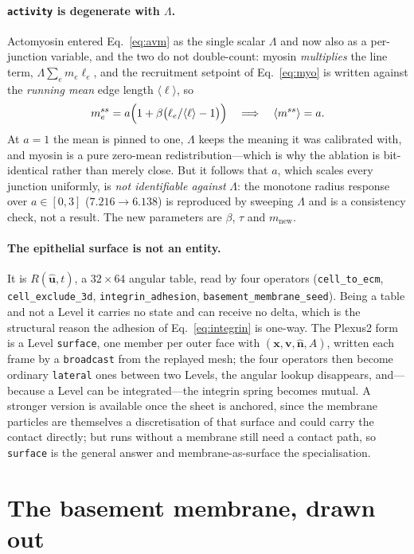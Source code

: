 \documentclass[10pt]{article}
\newcommand{\op}[1]{\texttt{#1}}
\begin{document}
\paragraph{\op{activity} is degenerate with $\Lambda$.} Actomyosin entered Eq.~\eqref{eq:avm} as the
single scalar $\Lambda$ and now also as a per-junction variable, and the two do not double-count: myosin
\emph{multiplies} the line term, $\Lambda\sum_e m_e\ell_e$, and the recruitment setpoint of
Eq.~\eqref{eq:myo} is written against the \emph{running mean} edge length
$\langle\ell\rangle$, so
\[ m^{ss}_e=a\Bigl(1+\beta\bigl(\ell_e/\langle\ell\rangle-1\bigr)\Bigr) \quad\Longrightarrow\quad \langle m^{ss}\rangle=a . \]
At $a=1$ the mean is pinned to one, $\Lambda$ keeps the meaning it was calibrated with, and myosin is a
pure zero-mean redistribution---which is why the ablation is bit-identical rather than merely close.
But it follows that $a$, which scales every junction uniformly, is \emph{not identifiable against}
$\Lambda$: the monotone radius response over $a\in[0,3]$ ($7.216\to6.138$) is reproduced by sweeping
$\Lambda$ and is a consistency check, not a result. The new parameters are $\beta$, $\tau$ and
$m_{\text{new}}$.

\paragraph{The epithelial surface is not an entity.} It is $R(\hat{\mathbf u},t)$, a $32\times64$ angular
table, read by four operators (\op{cell\_to\_ecm}, \op{cell\_exclude\_3d}, \op{integrin\_adhesion},
\op{basement\_membrane\_seed}). Being a table and not a Level it carries no state and can receive no
delta, which is the structural reason the adhesion of Eq.~\eqref{eq:integrin} is one-way. The Plexus2
form is a Level \op{surface}, one member per outer face with $(\mathbf x,\mathbf v,\hat{\mathbf n},A)$,
written each frame by a \op{broadcast} from the replayed mesh; the four operators then become ordinary
\op{lateral} ones between two Levels, the angular lookup disappears, and---because a Level can be
integrated---the integrin spring becomes mutual. A stronger version is available once the sheet is
anchored, since the membrane particles are themselves a discretisation of that surface and could carry
the contact directly; but runs without a membrane still need a contact path, so \op{surface} is the
general answer and membrane-as-surface the specialisation.

\section{The basement membrane, drawn out}
\end{document}
